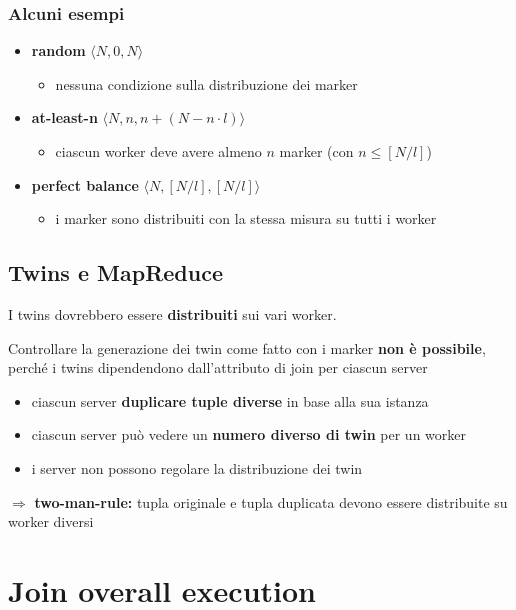 \documentclass{report}
\begin{document}
\subsubsection{Alcuni esempi}
\begin{itemize}
    \item \textbf{random} $\langle N, 0, N \rangle$
    \begin{itemize}
        \item nessuna condizione sulla distribuzione dei marker 
    \end{itemize}
    \item \textbf{at-least-n} $\langle N, n, n + (N-n \cdot l) \rangle$
    \begin{itemize}
        \item ciascun worker deve avere almeno $n$ marker (con $n \leq [N/l]$)
    \end{itemize}
    \item \textbf{perfect balance} $\langle N, [N/l], [N/l] \rangle$
    \begin{itemize}
        \item i marker sono distribuiti con la stessa misura su tutti i worker
    \end{itemize}
\end{itemize}

\subsection{Twins e MapReduce}

I twins dovrebbero essere \textbf{distribuiti} sui vari worker.

\noindent Controllare la generazione dei twin come fatto con i marker \textbf{non 
è possibile}, perché i twins dipendendono dall'attributo di join per ciascun server
\begin{itemize}
    \item ciascun server \textbf{duplicare tuple diverse} in base alla sua istanza 
    \item ciascun server può vedere un \textbf{numero diverso di twin} per un worker 
    \item i server non possono regolare la distribuzione dei twin 
\end{itemize}

\noindent $\Rightarrow$ \textbf{two-man-rule:} tupla originale e tupla duplicata devono 
essere distribuite su worker diversi 


\section{Join overall execution}
\end{document}

